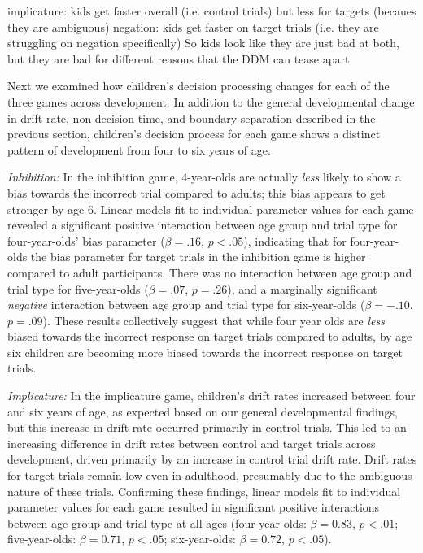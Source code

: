 \documentclass[10pt,letterpaper]{article}
\begin{document}
implicature: kids get faster overall (i.e. control trials) but less for targets (becaues they are ambiguous)
	negation: kids get faster on target trials (i.e. they are struggling on negation specifically)
	So kids look like they are just bad at both, but they are bad for different reasons that the DDM can tease 	apart.

Next we examined how children's decision processing changes for each of the three games across development.  In addition to the general developmental change in drift rate, non decision time, and boundary separation described in the previous section, children's decision process for each game shows a distinct pattern of development from four to six years of age.  

\emph{Inhibition:} In the inhibition game, 4-year-olds are actually \emph{less} likely to show a bias towards the incorrect trial compared to adults; this bias appears to get stronger by age 6.  Linear models fit to individual parameter values for each game revealed a significant positive interaction between age group and trial type for four-year-olds' bias parameter ($\beta = .16$, $p< .05$), indicating that for four-year-olds the bias parameter for target trials in the inhibition game is higher compared to adult participants.  There was no interaction between age group and trial type for five-year-olds ($\beta = .07$, $p = .26$), and a marginally significant \emph{negative} interaction between age group and trial type for six-year-olds ($\beta = -.10$, $p = .09$).  These results collectively suggest that while four year olds are \emph{less} biased towards the incorrect response on target trials compared to adults, by age six children are becoming more biased towards the incorrect response on target trials.  

\emph{Implicature:} In the implicature game, children's drift rates increased between four and six years of age, as expected based on our general developmental findings, but this increase in drift rate occurred primarily in control trials.  This led to an increasing difference in drift rates between control and target trials across development, driven primarily by an increase in control trial drift rate.  Drift rates for target trials remain low even in adulthood, presumably due to the ambiguous nature of these trials.  Confirming these findings, linear models fit to individual parameter values for each game resulted in significant positive interactions between age group and trial type at all ages (four-year-olds: $\beta = 0.83$, $p <.01$; five-year-olds: $\beta = 0.71$, $p <.05$; six-year-olds: $\beta = 0.72$, $p <.05$).
\end{document}
